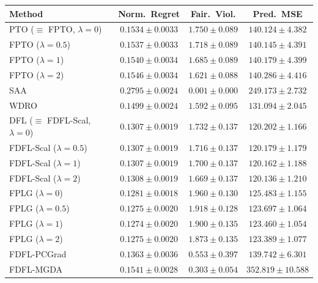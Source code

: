 \begin{table}[htbp]
\smallskip
\begin{tabular}{l ccc}
\toprule
Method & Norm.\ Regret & Fair.\ Viol. & Pred.\ MSE \\
\midrule
PTO ($\equiv$ FPTO, $\lambda\!=\!0$)         & $0.1534 \pm 0.0033$ & $1.750 \pm 0.089$ & $140.124 \pm 4.382$ \\
FPTO ($\lambda\!=\!0.5$)                     & $0.1537 \pm 0.0033$ & $1.718 \pm 0.089$ & $140.145 \pm 4.391$ \\
FPTO ($\lambda\!=\!1$)                       & $0.1540 \pm 0.0034$ & $1.685 \pm 0.089$ & $140.179 \pm 4.399$ \\
FPTO ($\lambda\!=\!2$)                       & $0.1546 \pm 0.0034$ & $1.621 \pm 0.088$ & $140.286 \pm 4.416$ \\
\midrule
SAA                                          & $0.2795 \pm 0.0024$ & $\mathbf{0.001 \pm 0.000}$ & $249.173 \pm 2.732$ \\
WDRO                                         & $0.1499 \pm 0.0024$ & $1.592 \pm 0.095$ & $131.094 \pm 2.045$ \\
\midrule
DFL ($\equiv$ FDFL-Scal, $\lambda\!=\!0$)    & $0.1307 \pm 0.0019$ & $1.732 \pm 0.137$ & $120.202 \pm 1.166$ \\
FDFL-Scal ($\lambda\!=\!0.5$)                & $0.1307 \pm 0.0019$ & $1.716 \pm 0.137$ & $120.179 \pm 1.179$ \\
FDFL-Scal ($\lambda\!=\!1$)                  & $0.1307 \pm 0.0019$ & $1.700 \pm 0.137$ & $120.162 \pm 1.188$ \\
FDFL-Scal ($\lambda\!=\!2$)                  & $0.1308 \pm 0.0019$ & $1.669 \pm 0.137$ & $\mathbf{120.136 \pm 1.210}$ \\
\midrule
FPLG ($\lambda\!=\!0$)                       & $0.1281 \pm 0.0018$ & $1.960 \pm 0.130$ & $125.483 \pm 1.155$ \\
FPLG ($\lambda\!=\!0.5$)                     & $0.1275 \pm 0.0020$ & $1.918 \pm 0.128$ & $123.697 \pm 1.064$ \\
FPLG ($\lambda\!=\!1$)                       & $\mathbf{0.1274 \pm 0.0020}$ & $1.900 \pm 0.135$ & $123.460 \pm 1.054$ \\
FPLG ($\lambda\!=\!2$)                       & $0.1275 \pm 0.0020$ & $1.873 \pm 0.135$ & $123.389 \pm 1.077$ \\
\midrule
FDFL-PCGrad                                  & $0.1363 \pm 0.0036$ & $0.553 \pm 0.397$ & $139.742 \pm 6.301$ \\
FDFL-MGDA                                    & $0.1541 \pm 0.0028$ & $0.303 \pm 0.054$ & $352.819 \pm 10.588$ \\
\bottomrule
\end{tabular}

\end{table}
